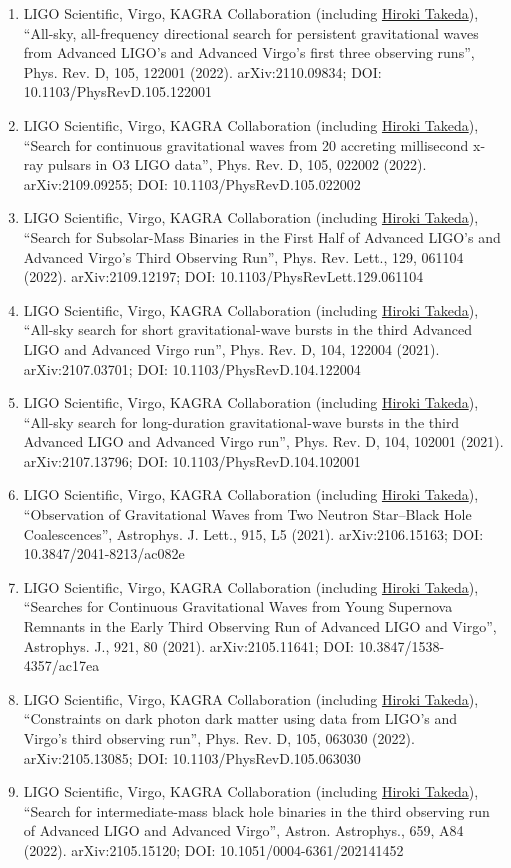 \documentclass[uplatex, 11pt]{jsarticle}
\begin{document}
\begin{enumerate}
\item LIGO Scientific, Virgo, KAGRA Collaboration (including \uline{Hiroki Takeda}), “All-sky, all-frequency directional search for persistent gravitational waves from Advanced LIGO's and Advanced Virgo's first three observing runs”, Phys. Rev. D, 105, 122001 (2022). arXiv:2110.09834; DOI: 10.1103/PhysRevD.105.122001
\item LIGO Scientific, Virgo, KAGRA Collaboration (including \uline{Hiroki Takeda}), “Search for continuous gravitational waves from 20 accreting millisecond x-ray pulsars in O3 LIGO data”, Phys. Rev. D, 105, 022002 (2022). arXiv:2109.09255; DOI: 10.1103/PhysRevD.105.022002
\item LIGO Scientific, Virgo, KAGRA Collaboration (including \uline{Hiroki Takeda}), “Search for Subsolar-Mass Binaries in the First Half of Advanced LIGO's and Advanced Virgo's Third Observing Run”, Phys. Rev. Lett., 129, 061104 (2022). arXiv:2109.12197; DOI: 10.1103/PhysRevLett.129.061104
\item LIGO Scientific, Virgo, KAGRA Collaboration (including \uline{Hiroki Takeda}), “All-sky search for short gravitational-wave bursts in the third Advanced LIGO and Advanced Virgo run”, Phys. Rev. D, 104, 122004 (2021). arXiv:2107.03701; DOI: 10.1103/PhysRevD.104.122004
\item LIGO Scientific, Virgo, KAGRA Collaboration (including \uline{Hiroki Takeda}), “All-sky search for long-duration gravitational-wave bursts in the third Advanced LIGO and Advanced Virgo run”, Phys. Rev. D, 104, 102001 (2021). arXiv:2107.13796; DOI: 10.1103/PhysRevD.104.102001
\item LIGO Scientific, Virgo, KAGRA Collaboration (including \uline{Hiroki Takeda}), “Observation of Gravitational Waves from Two Neutron Star--Black Hole Coalescences”, Astrophys. J. Lett., 915, L5 (2021). arXiv:2106.15163; DOI: 10.3847/2041-8213/ac082e
\item LIGO Scientific, Virgo, KAGRA Collaboration (including \uline{Hiroki Takeda}), “Searches for Continuous Gravitational Waves from Young Supernova Remnants in the Early Third Observing Run of Advanced LIGO and Virgo”, Astrophys. J., 921, 80 (2021). arXiv:2105.11641; DOI: 10.3847/1538-4357/ac17ea
\item LIGO Scientific, Virgo, KAGRA Collaboration (including \uline{Hiroki Takeda}), “Constraints on dark photon dark matter using data from LIGO's and Virgo's third observing run”, Phys. Rev. D, 105, 063030 (2022). arXiv:2105.13085; DOI: 10.1103/PhysRevD.105.063030
\item LIGO Scientific, Virgo, KAGRA Collaboration (including \uline{Hiroki Takeda}), “Search for intermediate-mass black hole binaries in the third observing run of Advanced LIGO and Advanced Virgo”, Astron. Astrophys., 659, A84 (2022). arXiv:2105.15120; DOI: 10.1051/0004-6361/202141452

\end{enumerate}
\end{document}
